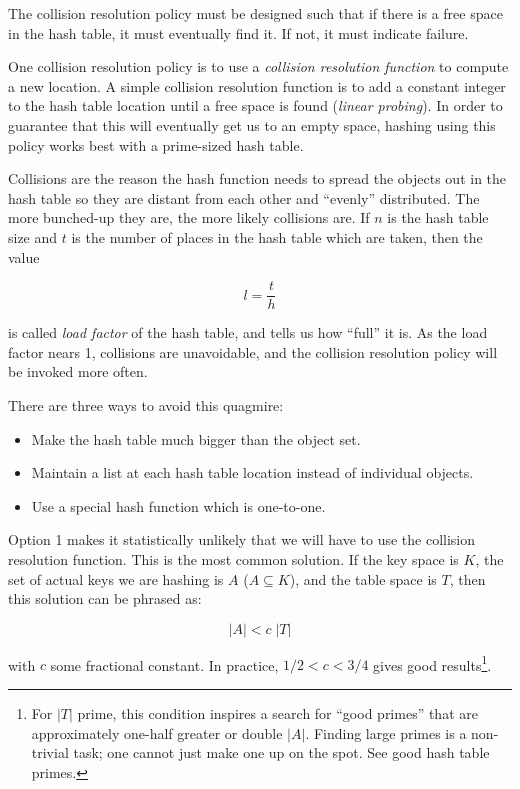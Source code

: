 \documentclass[12pt]{article}
\begin{document}
The collision resolution policy must be designed such that if there is a free space in the hash table, it must eventually find it.  If not, it must indicate failure.

One collision resolution policy is to use a \emph{collision resolution function} to compute a new location.  A simple collision resolution function is to add a constant integer to the hash table location until a free space is found (\emph{linear probing}).  In order to guarantee that this will eventually get us to an empty space, hashing using this policy works best with a prime-sized hash table.  

Collisions are the reason the hash function needs to spread the objects out in the hash table so they are distant from each other and ``evenly'' distributed. The more bunched-up they are, the more likely collisions are.  If $n$ is the hash table size and $t$ is the number of places in the hash table which are taken, then the value

$$ l = \frac{t}{h} $$

is called \emph{load factor} of the hash table, and tells us how ``full'' it is.  As the load factor nears 1, collisions are unavoidable, and the collision resolution policy will be invoked more often.

There are three ways to avoid this quagmire: 

\begin{itemize}

\item Make the hash table much bigger than the object set.
\item Maintain a list at each hash table location instead of individual objects.
\item Use a special hash function which is one-to-one.

\end{itemize}

Option 1 makes it statistically unlikely that we will have to use the collision resolution function.  This is the most common solution.  If the key space is $K$, the set of actual keys we are hashing is $A$ ($A \subseteq K$), and the table space is $T$, then this solution can be phrased as:

$$ |A| < c \; |T| $$

with $c$ some fractional constant.  In practice, $1/2 < c < 3/4$ gives good results\footnote{For $|T|$ prime, this condition inspires a search for ``good primes'' that are approximately one-half greater or double $|A|$.  Finding large primes is a non-trivial task; one cannot just make one up on the spot. See good hash table primes.}.
\end{document}
